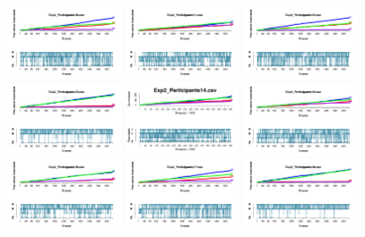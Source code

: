 \documentclass[a4paper ]{article}
\begin{document}
\begin{figure}[th]
\includegraphics[width=0.3\textwidth]{Figures/Outcome_Exp2_P10} \includegraphics[width=0.3\textwidth]{Figures/Outcome_Exp2_P11} \includegraphics[width=0.3\textwidth]{Figures/Outcome_Exp2_P12}
\includegraphics[width=0.3\textwidth]{Figures/Outcome_Exp2_P13} \includegraphics[width=0.3\textwidth]{Figures/Outcome_Exp2_P14} \includegraphics[width=0.3\textwidth]{Figures/Outcome_Exp2_P15}
\includegraphics[width=0.3\textwidth]{Figures/Outcome_Exp2_P16} \includegraphics[width=0.3\textwidth]{Figures/Outcome_Exp2_P17} \includegraphics[width=0.3\textwidth]{Figures/Outcome_Exp2_P18}

\end{figure}
\end{document}
